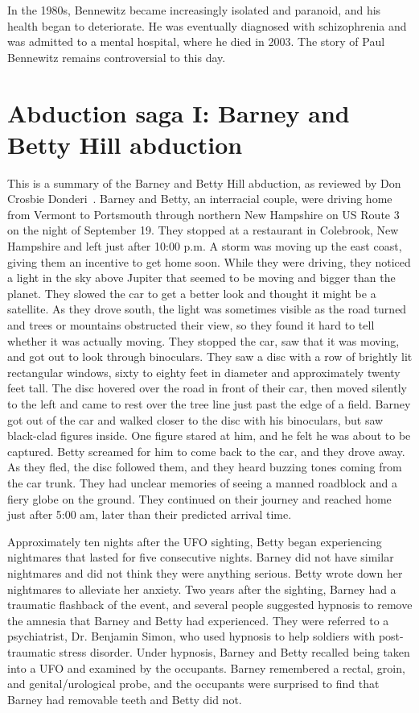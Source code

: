 In the 1980s, Bennewitz became increasingly isolated and paranoid, and his health began to deteriorate. He was eventually diagnosed with schizophrenia and was admitted to a mental hospital, where he died in 2003. The story of Paul Bennewitz remains controversial to this day.


\section{Abduction saga I: Barney and Betty Hill abduction}
\label{2023-UFO-part-Perception-abductions-bbha}

This is a summary of the Barney and Betty Hill abduction, as reviewed by Don Crosbie Donderi~\cite{Donderi2013Jun}.
Barney and Betty, an interracial couple, were driving home from Vermont to Portsmouth through northern New Hampshire on US Route 3 on the night of September 19. They stopped at a restaurant in Colebrook, New Hampshire and left just after 10:00 p.m. A storm was moving up the east coast, giving them an incentive to get home soon. While they were driving, they noticed a light in the sky above Jupiter that seemed to be moving and bigger than the planet. They slowed the car to get a better look and thought it might be a satellite. As they drove south, the light was sometimes visible as the road turned and trees or mountains obstructed their view, so they found it hard to tell whether it was actually moving. They stopped the car, saw that it was moving, and got out to look through binoculars. They saw a disc with a row of brightly lit rectangular windows, sixty to eighty feet in diameter and approximately twenty feet tall. The disc hovered over the road in front of their car, then moved silently to the left
and came to rest over the tree line just past the edge of a field.
Barney got out of the car and walked closer to the disc with his binoculars, but saw black-clad figures inside.
One figure stared at him, and he felt he was about to be captured.
Betty screamed for him to come back to the car, and they drove away. As they fled, the disc followed them, and they heard buzzing tones coming from the car trunk. They had unclear memories of seeing a manned roadblock and a fiery globe on the ground.
They continued on their journey and reached home just after 5:00 am, later than their predicted arrival time.

Approximately ten nights after the UFO sighting, Betty began experiencing nightmares that lasted for five consecutive nights. Barney did not have similar nightmares and did not think they were anything serious. Betty wrote down her nightmares to alleviate her anxiety. Two years after the sighting, Barney had a traumatic flashback of the event, and several people suggested hypnosis to remove the amnesia that Barney and Betty had experienced. They were referred to a psychiatrist, Dr. Benjamin Simon, who used hypnosis to help soldiers with post-traumatic stress disorder. Under hypnosis, Barney and Betty recalled being taken into a UFO and examined by the occupants. Barney remembered a rectal, groin, and
genital/urological probe, and the occupants were surprised to find that Barney had removable teeth and Betty did not.

